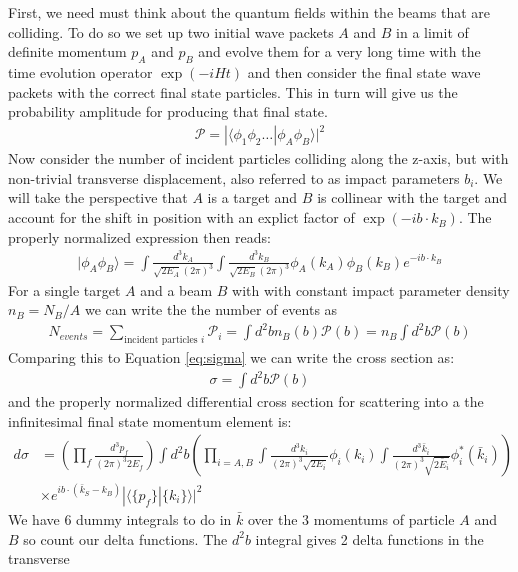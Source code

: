 First, we need  must think about the quantum fields within the beams that are colliding. To do so we set up two initial 
wave packets $A$ and $B$ in a limit of definite momentum $p_A$ and $p_B$ and evolve them for a very long time 
with the time evolution operator $\exp{(-iHt)}$ and then consider the final state wave packets with the correct final state particles. This in turn will give us the probability amplitude for producing that final state.  
\begin{align*}
\mathcal{P} = |\langle \phi_1 \phi_2 \ldots| \phi_A \phi_B \rangle | ^2 
\end{align*}
Now consider the number of incident particles colliding along the z-axis, but with non-trivial transverse displacement,
also referred to as impact parameters $b_i$. We will take the perspective that $A$ is a target and $B$ is collinear
with the target and account for the shift in position with an explict factor of $\exp(-ib \cdot k_B)$. The properly normalized expression then reads:  
\begin{align*}
|\phi_A \phi_B \rangle = \int \frac{d^3k_A}{\sqrt{2E_A}(2\pi)^3} \int \frac{d^3k_B}{\sqrt{2E_B}(2\pi)^3}\phi_A(k_A)\phi_B(k_B) e^{-ib \cdot k_B} 
\end{align*}
For a single target $A$ and a beam $B$ with with constant impact parameter density $n_B = N_B / A$ we can write the the number of events as
\begin{align*}
N_{events} = \sum_{\text{incident particles } i} \mathcal{P}_i = \int d^2b n_B(b) \mathcal{P}(b) = n_B \int d^2b \mathcal{P}(b) 
\end{align*}
Comparing this to Equation \ref{eq:sigma} we can write the cross section as:
\begin{align*}
\sigma = \int d^2 b \mathcal{P}(b) 
\end{align*}
and the properly normalized differential cross section for scattering into a the infinitesimal final state momentum element is:
\begin{align*}
 d\sigma &= \left( \prod_f \frac{d^3p_f}{(2\pi)^3 2E_f} \right ) \int d^2b \left ( \prod_{i=A,B}
 \int \frac{d^3 k_i }{(2\pi)^3 \sqrt{2E_i}} \phi_i(k_i) \int \frac{d^3 \bar{k}_i}{(2\pi)^3
\sqrt{2\bar{E}_i}} \phi^*_i(\bar{k}_i) \right)\\ 
 &\times e^{ib\cdot (\bar{k}_S - k_B)} | \langle \{ p_f\} | \{k_i \} \rangle |^2 
\end{align*}
We have 6 dummy integrals to do in $\bar{k}$ over the 3 momentums of particle $A$ and $B$
 so count our delta functions. The $d^2b$ integral gives 2 delta functions in the transverse 
